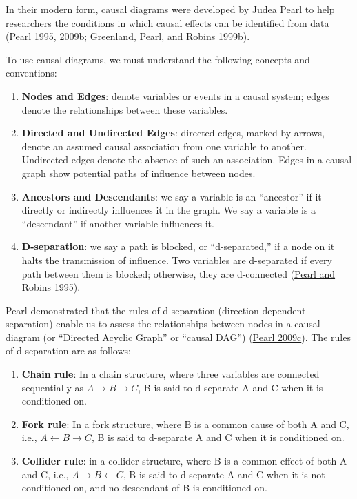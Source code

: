 \documentclass[
  singlecolumn]{report}
\begin{document}
In their modern form, causal diagrams were developed by Judea Pearl to
help researchers the conditions in which causal effects can be
identified from data (\protect\hyperlink{ref-pearl1995}{Pearl 1995},
\protect\hyperlink{ref-pearl2009a}{2009b};
\protect\hyperlink{ref-greenland1999b}{Greenland, Pearl, and Robins
1999b}).

To use causal diagrams, we must understand the following concepts and
conventions:

\begin{enumerate}
\def\labelenumi{\arabic{enumi}.}
\item
  \textbf{Nodes and Edges}: denote variables or events in a causal
  system; edges denote the relationships between these variables.
\item
  \textbf{Directed and Undirected Edges}: directed edges, marked by
  arrows, denote an assumed causal association from one variable to
  another. Undirected edges denote the absence of such an association.
  Edges in a causal graph show potential paths of influence between
  nodes.
\item
  \textbf{Ancestors and Descendants}: we say a variable is an
  ``ancestor'' if it directly or indirectly influences it in the graph.
  We say a variable is a ``descendant'' if another variable influences
  it.
\item
  \textbf{D-separation}: we say a path is blocked, or ``d-separated,''
  if a node on it halts the transmission of influence. Two variables are
  d-separated if every path between them is blocked; otherwise, they are
  d-connected (\protect\hyperlink{ref-pearl1995a}{Pearl and Robins
  1995}).
\end{enumerate}

Pearl demonstrated that the rules of d-separation (direction-dependent
separation) enable us to assess the relationships between nodes in a
causal diagram (or ``Directed Acyclic Graph'' or ``causal DAG'')
(\protect\hyperlink{ref-pearl2009b}{Pearl 2009c}). The rules of
d-separation are as follows:

\begin{enumerate}
\def\labelenumi{\alph{enumi}.}
\item
  \textbf{Chain rule}: In a chain structure, where three variables are
  connected sequentially as \(A \rightarrow B \rightarrow C\), B is said
  to d-separate A and C when it is conditioned on.
\item
  \textbf{Fork rule}: In a fork structure, where B is a common cause of
  both A and C, i.e., \(A \leftarrow B \rightarrow C\), B is said to
  d-separate A and C when it is conditioned on.
\item
  \textbf{Collider rule}: in a collider structure, where B is a common
  effect of both A and C, i.e., \(A \rightarrow B \leftarrow C\), B is
  said to d-separate A and C when it is not conditioned on, and no
  descendant of B is conditioned on.
\end{enumerate}
\end{document}
